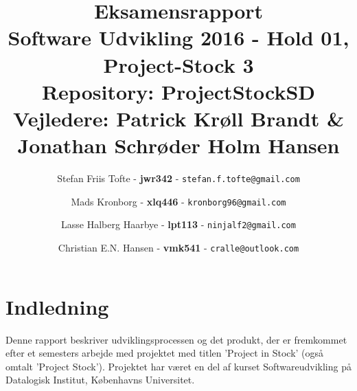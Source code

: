 \documentclass[12pt]{article}
\title{
  \vspace{3cm}
  \Huge{Eksamensrapport} \\
  \Large{Software Udvikling 2016 - Hold 01, Project-Stock 3} \\
  \large{Repository: ProjectStockSD} \\
  \Large{Vejledere: Patrick Krøll Brandt \& Jonathan Schrøder Holm Hansen}
}
\author{
	\Large{Stefan Friis Tofte} - \textbf{jwr342} - \texttt{stefan.f.tofte@gmail.com}
	\and
	\Large{Mads Kronborg} - \textbf{xlq446} - \texttt{kronborg96@gmail.com}
	\and
	\Large{Lasse Halberg Haarbye} - \textbf{lpt113} - \texttt{ninjalf2@gmail.com}
	\and
	\Large{Christian E.N. Hansen} - \textbf{vmk541} - \texttt{cralle@outlook.com}
}
\def \ColourPDF {../include/ku-farve}
\def \TitlePDF {../include/ku-en}  %
\begin{document}


\clearpage\maketitle
\thispagestyle{empty}

\newpage
\tableofcontents
\newpage

\section{Indledning}
\label{sec:indledning}
Denne rapport beskriver udviklingsprocessen og det produkt, der er fremkommet efter et semesters arbejde med projektet med titlen 'Project in Stock' (også omtalt 'Project Stock'). Projektet har været en del af kurset Softwareudvikling på Datalogisk Institut, Københavns Universitet.
\end{document}
